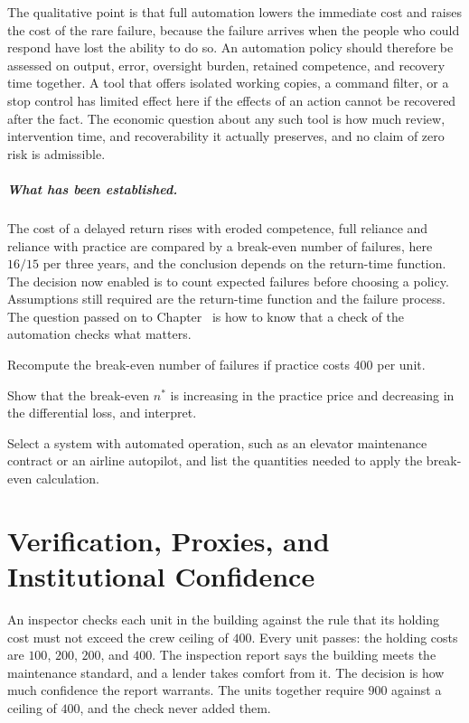 The qualitative point is that full automation lowers the immediate cost and raises the cost of the rare failure, because the failure arrives when the people who could respond have lost the ability to do so. An automation policy should therefore be assessed on output, error, oversight burden, retained competence, and recovery time together. A tool that offers isolated working copies, a command filter, or a stop control has limited effect here if the effects of an action cannot be recovered after the fact. The economic question about any such tool is how much review, intervention time, and recoverability it actually preserves, and no claim of zero risk is admissible.

\paragraph{What has been established.} The cost of a delayed return rises with eroded competence, full reliance and reliance with practice are compared by a break-even number of failures, here $16/15$ per three years, and the conclusion depends on the return-time function. The decision now enabled is to count expected failures before choosing a policy. Assumptions still required are the return-time function and the failure process. The question passed on to Chapter~ is how to know that a check of the automation checks what matters.

\begin{exercise}
Recompute the break-even number of failures if practice costs $400$ per unit.
\end{exercise}
\begin{exercise}
Show that the break-even $n^*$ is increasing in the practice price and decreasing in the differential loss, and interpret.
\end{exercise}
\begin{exercise}
Select a system with automated operation, such as an elevator maintenance contract or an airline autopilot, and list the quantities needed to apply the break-even calculation.
\end{exercise}

\chapter{Verification, Proxies, and Institutional Confidence}\label{ch:25}

An inspector checks each unit in the building against the rule that its holding cost must not exceed the crew ceiling of $400$. Every unit passes: the holding costs are $100$, $200$, $200$, and $400$. The inspection report says the building meets the maintenance standard, and a lender takes comfort from it. The decision is how much confidence the report warrants. The units together require $900$ against a ceiling of $400$, and the check never added them.

